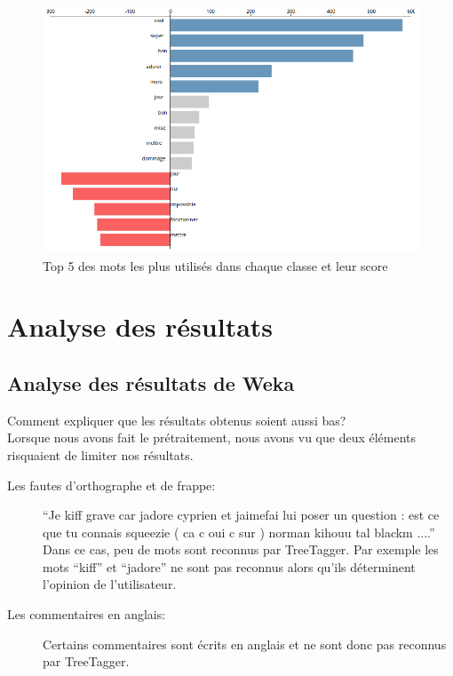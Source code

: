 \documentclass[a4paper, 11pt]{article}
\begin{document}
\begin{figure}[h]
\begin{center}
\includegraphics[width=\textwidth]{visu2.png}
\end{center}
\caption{Top 5 des mots les plus utilisés dans chaque classe et leur score}
\end{figure}


\section{Analyse des résultats}

\subsection{Analyse des résultats de Weka}
Comment expliquer que les résultats obtenus soient aussi bas?\\

Lorsque nous avons fait le prétraitement, nous avons vu que deux éléments risquaient de limiter nos résultats.

\begin{description}
	\item [Les fautes d'orthographe et de frappe: ]``Je kiff grave car jadore cyprien et jaimefai lui poser un question : est ce que tu connais squeezie ( ca c oui c sur ) norman kihouu tal blackm ....''\\
	
	Dans ce cas, peu de mots sont reconnus par TreeTagger. Par exemple les mots ``kiff'' et ``jadore'' ne sont pas reconnus alors qu'ils déterminent l'opinion de l'utilisateur.
	
	\item [Les commentaires en anglais: ]Certains commentaires sont écrits en anglais et ne sont donc pas reconnus par TreeTagger.
\end{description}
\end{document}
